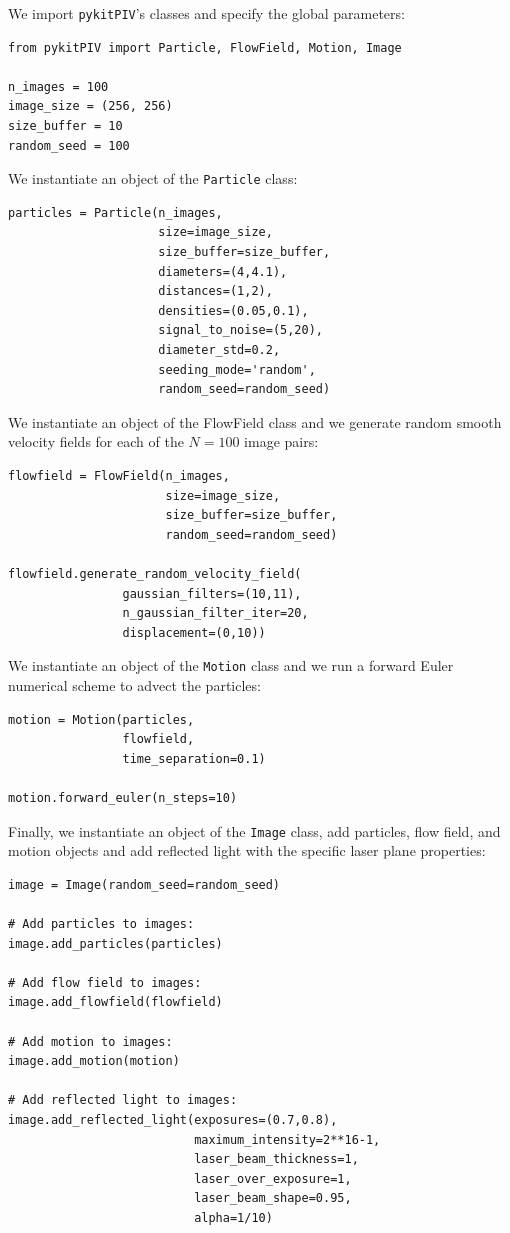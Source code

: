 \documentclass[a4paper,fleqn]{cas-dc}
\begin{document}
We import \texttt{pykitPIV}'s classes and specify the global parameters:
\lstset{language=Python}
\begin{lstlisting}
from pykitPIV import Particle, FlowField, Motion, Image

n_images = 100
image_size = (256, 256)
size_buffer = 10
random_seed = 100
\end{lstlisting}
We instantiate an object of the \texttt{Particle} class:
\lstset{language=Python}
\begin{lstlisting}
particles = Particle(n_images,
                     size=image_size,
                     size_buffer=size_buffer,
                     diameters=(4,4.1),
                     distances=(1,2),
                     densities=(0.05,0.1),
                     signal_to_noise=(5,20),
                     diameter_std=0.2,
                     seeding_mode='random',
                     random_seed=random_seed)
\end{lstlisting}
We instantiate an object of the FlowField class and we generate random smooth velocity fields for each of the $N=100$ image pairs:
\lstset{language=Python}
\begin{lstlisting}
flowfield = FlowField(n_images,
                      size=image_size,
                      size_buffer=size_buffer,
                      random_seed=random_seed)

flowfield.generate_random_velocity_field(
				gaussian_filters=(10,11),
				n_gaussian_filter_iter=20,
				displacement=(0,10))
\end{lstlisting}
We instantiate an object of the \texttt{Motion} class and we run a forward Euler numerical scheme to advect the particles:
\lstset{language=Python}
\begin{lstlisting}
motion = Motion(particles, 
                flowfield, 
                time_separation=0.1)
                
motion.forward_euler(n_steps=10)
\end{lstlisting}
Finally, we instantiate an object of the \texttt{Image} class, add particles, flow field, and motion objects and add reflected light with the specific laser plane properties:
\lstset{language=Python}
\begin{lstlisting}
image = Image(random_seed=random_seed)

# Add particles to images:
image.add_particles(particles)

# Add flow field to images:
image.add_flowfield(flowfield)

# Add motion to images:        
image.add_motion(motion)

# Add reflected light to images:
image.add_reflected_light(exposures=(0.7,0.8),
                          maximum_intensity=2**16-1,
                          laser_beam_thickness=1,
                          laser_over_exposure=1,
                          laser_beam_shape=0.95,
                          alpha=1/10)
\end{lstlisting}
\end{document}
